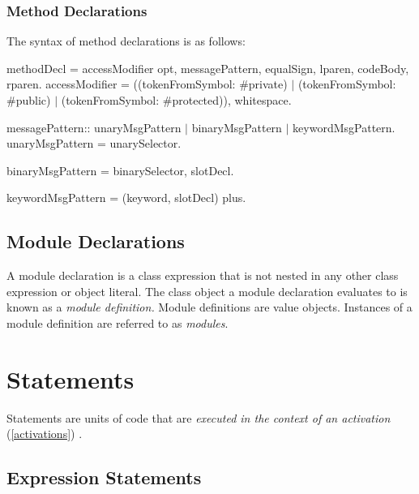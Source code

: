 \documentclass{article}
\begin{document}
\subsubsection{Method Declarations}
\label{methodDecls}

The syntax of method declarations is as follows:

\begin{newspeak}
methodDecl = accessModifier opt, messagePattern, equalSign, 
                  lparen, codeBody, rparen.
accessModifier =  ((tokenFromSymbol: {\#private}) $|$ 
                        (tokenFromSymbol: \#public) $|$
                        (tokenFromSymbol: \#protected)), whitespace.
                    
messagePattern::  unaryMsgPattern $|$
                       binaryMsgPattern $|$
                       keywordMsgPattern.
unaryMsgPattern = unarySelector.

binaryMsgPattern = binarySelector, slotDecl.  
                                                         
keywordMsgPattern = (keyword, slotDecl) plus.   
\end{newspeak}


\subsection{Module Declarations} 
\label{module}

A module declaration is a class expression that is not nested in any other class expression or object literal.  The class object a module declaration evaluates to is known as a {\em module definition.} Module definitions are value objects.  Instances of a module definition are referred to as {\em modules}.





\section{Statements}
\label{statement}

Statements are units of code that are {\em executed in the context of an activation}  (\ref{activations}) .


\subsection{Expression Statements}
\label{expr}
\end{document}
